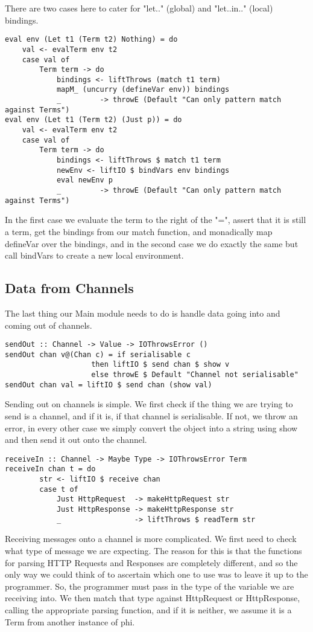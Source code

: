 There are two cases here to cater for "let.." (global) and "let..in.." (local) bindings.
\begin{verbatim}
eval env (Let t1 (Term t2) Nothing) = do 
    val <- evalTerm env t2 
    case val of 
        Term term -> do
            bindings <- liftThrows (match t1 term)
            mapM_ (uncurry (defineVar env)) bindings
            _         -> throwE (Default "Can only pattern match against Terms")
eval env (Let t1 (Term t2) (Just p)) = do
    val <- evalTerm env t2 
    case val of 
        Term term -> do
            bindings <- liftThrows $ match t1 term
            newEnv <- liftIO $ bindVars env bindings
            eval newEnv p
            _         -> throwE (Default "Can only pattern match against Terms")
\end{verbatim}
In the first case we evaluate the term to the right of the "=", assert that it is still a term, get the bindings from our match function, and monadically map defineVar over the bindings, and in the second case we do exactly the same but call bindVars to create a new local environment.

\subsection{Data from Channels}

The last thing our Main module needs to do is handle data going into and coming out of channels.
\label{sec:sendout}
\begin{verbatim}
sendOut :: Channel -> Value -> IOThrowsError () 
sendOut chan v@(Chan c) = if serialisable c
                    then liftIO $ send chan $ show v
                    else throwE $ Default "Channel not serialisable" 
sendOut chan val = liftIO $ send chan (show val)
\end{verbatim}
Sending out on channels is simple. We first check if the thing we are trying to send is a channel, and if it is, if that channel is serialisable. If not, we throw an error, in every other case we simply convert the object into a string using show and then send it out onto the channel.


\begin{verbatim}
receiveIn :: Channel -> Maybe Type -> IOThrowsError Term
receiveIn chan t = do
        str <- liftIO $ receive chan
        case t of
            Just HttpRequest  -> makeHttpRequest str
            Just HttpResponse -> makeHttpResponse str
            _                 -> liftThrows $ readTerm str
\end{verbatim}
Receiving messages onto a channel is more complicated. We first need to check what type of message we are expecting. The reason for this is that the functions for parsing HTTP Requests and Responses are completely different, and so the only way we could think of to ascertain which one to use was to leave it up to the programmer. So, the programmer must pass in the type of the variable we are receiving into. We then match that type against HttpRequest or HttpResponse, calling the appropriate
parsing function, and if it is neither, we assume it is a Term from another instance of phi.

